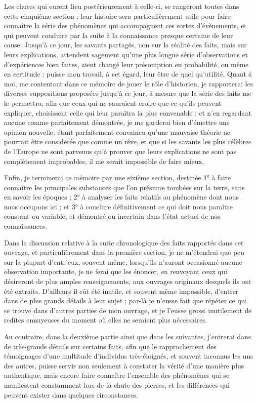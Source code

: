 \documentclass[a4paper, 12pt, oneside, french]{article}
\begin{document}
Les chutes qui eurent lieu postérieurement à celle-ci, se rangeront toutes dans cette cinquième section ; leur histoire sera particulièrement utile pour faire connaître la série des phénomènes qui accompagnent ces sortes d'évènements, et qui peuvent conduire par la suite à la connaissance presque certaine de leur cause. Jusqu'à ce jour, les savants partagés, non sur la réalité des faits, mais sur leurs explications, attendent sagement qu'une plus longue série d'observations et d'expériences bien faites, aient changé leur présomption en probabilité, ou même en certitude : puisse mon travail, à cet égard, leur être de quel qu’utilité. Quant à moi, me contentant dans ce mémoire de jouer le rôle d'historien, je rapporterai les diverses suppositions proposées jusqu'à ce jour, à mesure que la série des faits me le permettra, afin que ceux qui ne sauraient croire que ce qu'ils peuvent expliquer, choisissent celle qui leur paraîtra la plus convenable ; et n'en regardant aucune comme parfaitement démontrée, je me garderai bien d'émettre une opinion nouvelle, étant parfaitement convaincu qu'une mauvaise théorie ne pourrait être considérée que comme un rêve, et que si les savants les plus célèbres de l'Europe ne sont parvenus qu'à prouver que leurs explications ne sont pas complètement improbables, il me serait impossible de faire mieux.

Enfin, je terminerai ce mémoire par une sixième section, destinée 1° à faire connaître les principales substances que l'on présume tombées sur la terre, sans en savoir les époques ; 2° à analyser les faits relatifs au phénomène dont nous nous occupons ici ; et 3° à conclure définitivement ce qui doit nous paraître constant ou variable, et démontré ou incertain dans l'état actuel de nos connaissances.

Dans la discussion relative à la suite chronologique des faits rapportés dans cet ouvrage, et particulièrement dans la première section, je ne m'étendrai que peu sur la plupart d'entr'eux, souvent même, lorsqu'ils n'auront occasionné aucune observation importante, je ne ferai que les énoncer, en renvoyant ceux qui désireront de plus amples renseignements, aux ouvrages originaux desquels ils ont été extraits. D'ailleurs il eût été inutile, et souvent même impossible, d'entrer dans de plus grands détails à leur sujet ; par-là je n'eusse fait que répéter ce qui se trouve dans d'autres parties de mon ouvrage, et je l'eusse grossi inutilement de redites ennuyeuses du moment où elles ne seraient plus nécessaires.

Au contraire, dans la deuxième partie ainsi que dans les suivantes, j'entrerai dans de très-grands détails sur certains faits, afin que le rapprochement des témoignages d'une multitude d'individus très-éloignés, et souvent inconnus les uns des autres, puisse servir non seulement à constater la vérité d'une manière plus authentique, mais encore faire connaître l'ensemble des phénomènes qui se manifestent constamment lors de la chute des pierres, et les différences qui peuvent exister dans quelques circonstances.
\end{document}
